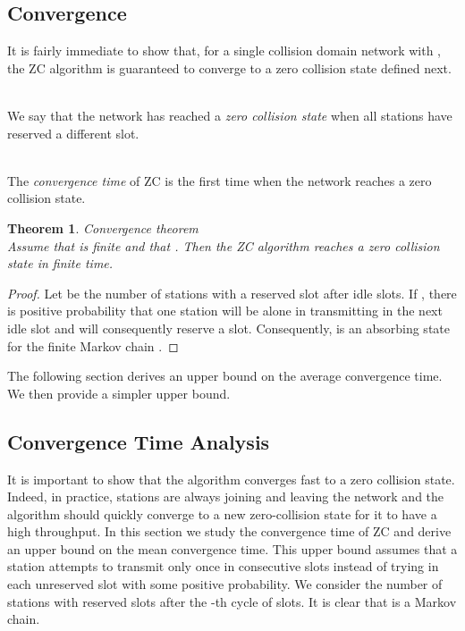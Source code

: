 \documentclass{acm_proc_article-sp}
\newtheorem{theorem}{Theorem}
\newcommand{\rt}{\xspace}
\newcommand{\m}{\xspace}
\begin{document}
\subsection{Convergence}
It is fairly immediate to show that, for a single collision domain network with ,  the ZC algorithm is guaranteed to converge  to a zero collision state defined next.

\\
We say that the network has reached a {\em zero collision state} when all  stations have reserved a different slot.

\\
The {\em convergence time} of ZC is the first time when the network reaches a zero collision state.

\begin{theorem}{Convergence theorem}\\
Assume that \rt is finite and that \m . Then the ZC algorithm reaches a zero collision state in finite time.
\end{theorem}

\begin{proof}
Let  be the number of stations with a reserved slot after  idle slots.  If , there is positive probability that one station will be alone in transmitting in the next idle slot and will consequently reserve a slot.  Consequently,  is an absorbing state for the finite Markov chain .
\end{proof}


The following section derives an upper bound on the average convergence time. We then provide a simpler upper bound.

\subsection{Convergence Time Analysis}
It is important to show that the algorithm converges fast to a zero collision state.  Indeed, in practice, stations are always joining and leaving the network and the algorithm should quickly converge to a new zero-collision state for it to have a high throughput. In this section we study the convergence time of ZC and derive an upper bound on the mean convergence time. This upper bound assumes that a station attempts to transmit only once in  consecutive slots instead of trying in each unreserved slot with some positive probability.  We consider the number  of stations with reserved slots after the -th cycle of  slots.  It is clear that  is a Markov chain.
\end{document}
